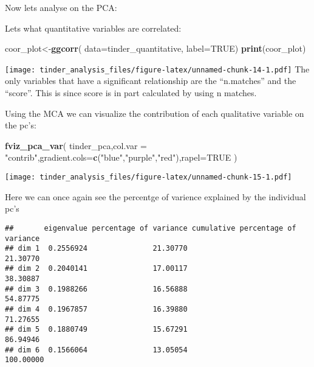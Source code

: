 \documentclass[
]{article}
\newenvironment{Shaded}{\begin{snugshade}}{\end{snugshade}}
\newcommand{\AttributeTok}[1]{\textcolor[rgb]{0.13,0.29,0.53}{#1}}
\newcommand{\ConstantTok}[1]{\textcolor[rgb]{0.56,0.35,0.01}{#1}}
\newcommand{\FunctionTok}[1]{\textcolor[rgb]{0.13,0.29,0.53}{\textbf{#1}}}
\newcommand{\NormalTok}[1]{#1}
\newcommand{\OtherTok}[1]{\textcolor[rgb]{0.56,0.35,0.01}{#1}}
\newcommand{\SpecialCharTok}[1]{\textcolor[rgb]{0.81,0.36,0.00}{\textbf{#1}}}
\newcommand{\StringTok}[1]{\textcolor[rgb]{0.31,0.60,0.02}{#1}}
\begin{document}
Now lets analyse on the PCA:

Lets what quantitative variables are correlated:

\begin{Shaded}
\begin{Highlighting}[]
\NormalTok{ coor\_plot}\OtherTok{\textless{}{-}}\FunctionTok{ggcorr}\NormalTok{(}
   \AttributeTok{data=}\NormalTok{tinder\_quantitative,}
   \AttributeTok{label=}\ConstantTok{TRUE}\NormalTok{)}
 \FunctionTok{print}\NormalTok{(coor\_plot)}
\end{Highlighting}
\end{Shaded}

\texttt{[image: tinder\_analysis\_files/figure-latex/unnamed-chunk-14-1.pdf]}
The only variables that have a significant relationship are the
``n.matches'' and the ``score''. This is since score is in part
calculated by using n matches.

Using the MCA we can visualize the contribution of each qualitative
variable on the pc's:

\begin{Shaded}
\begin{Highlighting}[]
\FunctionTok{fviz\_pca\_var}\NormalTok{(}
\NormalTok{  tinder\_pca,}\AttributeTok{col.var =} \StringTok{"contrib"}\NormalTok{,}\AttributeTok{gradient.cols=}\FunctionTok{c}\NormalTok{(}\StringTok{"blue"}\NormalTok{,}\StringTok{"purple"}\NormalTok{,}\StringTok{"red"}\NormalTok{),}\AttributeTok{rapel=}\ConstantTok{TRUE}
\NormalTok{)}
\end{Highlighting}
\end{Shaded}

\texttt{[image: tinder\_analysis\_files/figure-latex/unnamed-chunk-15-1.pdf]}

Here we can once again see the percentge of varience explained by the
individual pc's

\begin{Shaded}
\end{Shaded}

\begin{verbatim}
##       eigenvalue percentage of variance cumulative percentage of variance
## dim 1  0.2556924               21.30770                          21.30770
## dim 2  0.2040141               17.00117                          38.30887
## dim 3  0.1988266               16.56888                          54.87775
## dim 4  0.1967857               16.39880                          71.27655
## dim 5  0.1880749               15.67291                          86.94946
## dim 6  0.1566064               13.05054                         100.00000
\end{verbatim}
\end{document}

